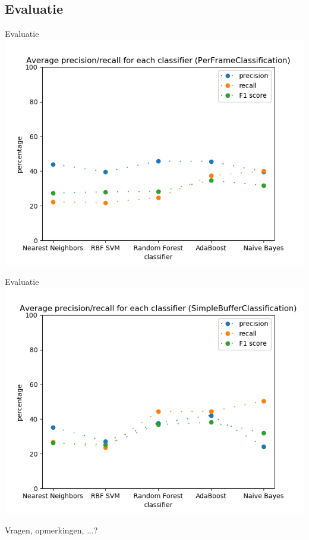 \documentclass[]{beamer}
\begin{document}
	\subsection{Evaluatie}
	\begin{frame}{Evaluatie}
		\centering
		\includegraphics[width=0.8\linewidth]{PerFrameClassification_PreProcessing}
	\end{frame}
	\begin{frame}{Evaluatie}
		\centering
		\includegraphics[width=0.7\linewidth]{SimpleBufferClassification_PreProcessing}
	\end{frame}
	
	
	\begin{frame}
		\begin{center}
			\Huge Vragen, opmerkingen, ...?
		\end{center}
	\end{frame}
\end{document}
